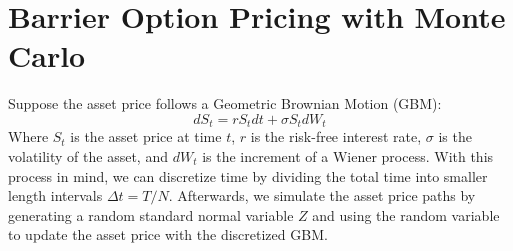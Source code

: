\chapter{Barrier Option Pricing with Monte Carlo}
Suppose the asset price follows a Geometric Brownian Motion (GBM):
\begin{equation}\label{eq:GBM}
	dS_t=rS_tdt+\sigma S_tdW_t
\end{equation}
Where $S_t$ is the asset price at time $t$, $r$ is the risk-free interest rate, $\sigma$ is the volatility of the asset, and $dW_t$ is the increment of a Wiener process. With this process in mind, we can discretize time by dividing the total time into smaller length intervals $\Delta t=T/N.$ Afterwards, we simulate the asset price paths by generating a random standard normal variable $Z$ and using the random variable to update the asset price with the discretized GBM.


